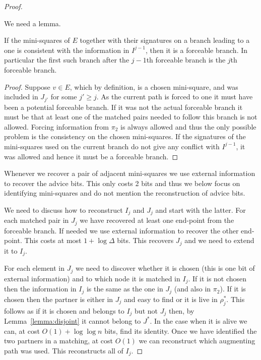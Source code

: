 \documentclass{article}\usepackage[a4paper,margin=20mm]{geometry}
\begin{document}
\begin{proof}
\begin{enumerate}
\end{enumerate}
We need a lemma.
\begin{lemma}
If the mini-squares of $E$ together with their signatures
on a branch leading to a one is consistent with the information
in $I^{j-1}$, then it is a forceable branch.  In particular the
first such branch after the $j-1$th forceable
branch is the $j$th forceable branch.
\end{lemma}

\begin{proof}
Suppose $v \in E$, which by definition, is a chosen 
mini-square, and was included in $J_{j'}$ for some $j' \geq j$.
As the current path is forced to one it must have been
a potential forceable branch.  If it was not the actual
forceable branch it must be that  at least one
of the matched pairs needed to follow this branch is not allowed.
Forcing information from $\pi_2$ is always allowed and
thus the only possible problem is the consistency on
the chosen mini-squares.  If the signatures of the
mini-squares used on the current branch do not give any conflict 
with $I^{j-1}$,  it was allowed and hence it
must be a forceable branch.
\end{proof}

Whenever we recover a pair of adjacent mini-squares
we use external information to recover the advice
bits.  This only costs 2 bits and thus we below
focus on identifying mini-squares and do not mention
the reconstruction of advice bits.  

We need to discuss how to reconstruct $I_j$ and $J_j$
and start with the latter.  For each matched
pair in $J_j$ we have recovered at least one end-point
from the forceable branch.
If needed we use external information to recover 
the other end-point.  This costs at most $1+\log \Delta$ bits.
This recovers $J_j$ and we need to extend it to $I_j$.

For each element in $J_j$ we need to discover whether it is chosen (this 
is one bit of external information) and to which node it is matched 
in $I_j$.  If it is not chosen then the information in $I_j$
is the same as the one in $J_j$ (and also in $\pi_2$).  
If it is chosen then the partner is either 
in $J_j$ and easy to find or it is live in $\rho^*_j$.
This follows as if it is chosen and belongs to $I_j$ but not $J_j$
then, by Lemma~\ref{lemma:disjoint} it cannot belong to $J^*$.
In the case when it is alive we can, at cost $O(1)+ \log \log n$ bits, find 
its identity.  Once we have identified the
two partners in a matching, at cost $O(1)$ we
can reconstruct which augmenting path was used.  This reconstructs
all of $I_j$.


\end{proof}
\end{document}
